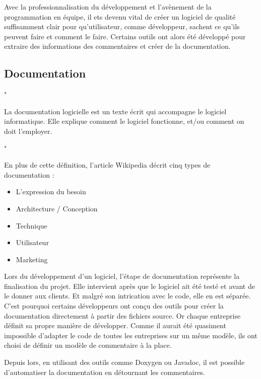 \documentclass[10pt,a4paper,twoside, openany]{report}
\begin{document}
Avec la professionnalisation du d\'eveloppement et l'av\`enement de la programmation en \'equipe, il ets devenu vital de cr\'eer un logiciel de qualit\'e suffisamment clair pour qu'utilisateur, comme d\'eveloppeur, sachent ce qu'ils peuvent faire et comment le faire. Certains outils ont alors \'et\'e d\'evelopp\'e pour extraire des informations des commentaires et cr\'eer de la documentation.

\subsection{Documentation}

\begin{quoting}
\begin{large}"\end{large}
La documentation logicielle est un texte \'ecrit qui accompagne le logiciel informatique. Elle explique comment le logiciel fonctionne, et/ou comment on doit l'employer.
\begin{large}"\end{large}
\end{quoting}

En plus de cette d\'efinition, l'article Wikipedia d\'ecrit cinq types de documentation :
\begin{itemize}
\item{L'expression du besoin}
\item{Architecture / Conception}
\item{Technique}
\item{Utilisateur}
\item{Marketing}
\end{itemize}

Lors du d\'eveloppement d'un logiciel, l'\'etape de documentation repr\'esente la finalisation du projet. Elle intervient apr\`es que le logiciel ait \'et\'e test\'e et avant de le donner aux clients. Et malgr\'e  son intrication avec le code, elle en est s\'epar\'ee. C'est pourquoi certains d\'eveloppeurs ont con\c cu  des outils pour cr\'eer la documentation directement \`a partir des fichiers source. Or chaque entreprise d\'efinit sa propre mani\`ere de d\'evelopper. Comme il aurait \'et\'e quasiment impossible d'adapter le code de toutes les entreprises sur un m\^eme mod\`ele, ils ont choisi de d\'efinir un mod\`ele de commentaire \`a la place.\newline

Depuis lors, en utilisant des outils comme Doxygen ou Javadoc, il est possible d'automatiser la documentation en d\'etournant les commentaires.
\end{document}
